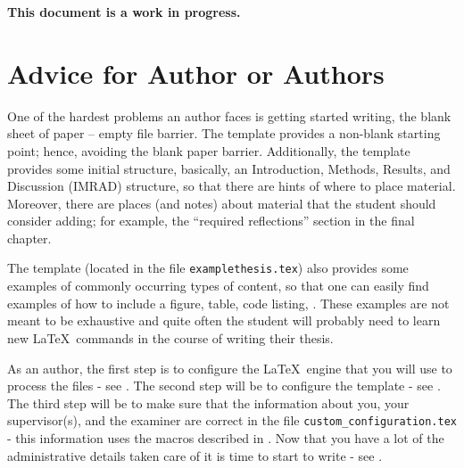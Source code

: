 \documentclass[examplethesis.tex]{subfiles}
\begin{document}
\noindent\textbf{This document is a work in progress.}


\section{Advice for Author or Authors}
\label{sec:authors}
One of the hardest problems an author faces is getting started writing, \ie the blank sheet of paper -- empty file barrier. The template provides a \mbox{non-blank} starting point; hence, avoiding the blank paper barrier. Additionally, the template provides some initial structure, basically, an Introduction, Methods, Results, and Discussion (IMRAD) structure, so that there are hints of where to place material. Moreover, there are places (and notes) about material that the student should consider adding; for example, the ``required reflections'' section in the final chapter.

The template (located in the file \texttt{examplethesis.tex}) also provides some examples of commonly occurring types of content, so that one can easily find examples of how to include a figure, table, code listing, \etc. These examples are not meant to be exhaustive and quite often the student will probably need to learn new \LaTeX\  commands in the course of writing their thesis.

As an author, the first step is to configure the \LaTeX\  engine that you will use to process the files - see . The second step will be to configure the template - see . The third step will be to make sure that the information about you, your supervisor(s), and the examiner are correct in the file \texttt{custom\_configuration.tex} - this information uses the macros described in . Now that you have a lot of the administrative details taken care of it is time to start to write - see .
\end{document}
